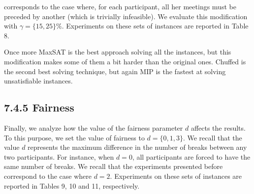 \documentclass[10pt]{article}
\begin{document}
corresponds to the case where, for each participant, all her meetings must be preceded by another (which is trivially infeasible). We evaluate this modification with $\gamma=\{15,25\} \%$. Experiments on these sets of instances are reported in Table 8.

Once more MaxSAT is the best approach solving all the instances, but this modification makes some of them a bit harder than the original ones. Chuffed is the second best solving technique, but again MIP is the fastest at solving unsatisfiable instances.

\subsection*{7.4.5 Fairness}
Finally, we analyze how the value of the fairness parameter $d$ affects the results. To this purpose, we set the value of fairness to $d=\{0,1,3\}$. We recall that the value $d$ represents the maximum difference in the number of breaks between any two participants. For instance, when $d=0$, all participants are forced to have the same number of breaks. We recall that the experiments presented before correspond to the case where $d=2$. Experiments on these sets of instances are reported in Tables 9, 10 and 11, respectively.
\end{document}
